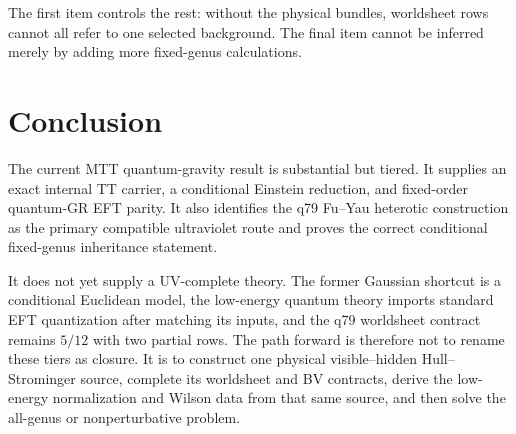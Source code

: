 \documentclass[11pt]{article}
\begin{document}
The first item controls the rest: without the physical bundles, worldsheet
rows cannot all refer to one selected background. The final item cannot be
inferred merely by adding more fixed-genus calculations.

\section{Conclusion}

The current MTT quantum-gravity result is substantial but tiered. It supplies
an exact internal TT carrier, a conditional Einstein reduction, and
fixed-order quantum-GR EFT parity. It also identifies the q79 Fu--Yau
heterotic construction as the primary compatible ultraviolet route and
proves the correct conditional fixed-genus inheritance statement.

It does not yet supply a UV-complete theory. The former Gaussian shortcut is
a conditional Euclidean model, the low-energy quantum theory imports
standard EFT quantization after matching its inputs, and the q79 worldsheet
contract remains \(5/12\) with two partial rows. The path forward is therefore
not to rename these tiers as closure. It is to construct one physical
visible--hidden Hull--Strominger source, complete its worldsheet and BV
contracts, derive the low-energy normalization and Wilson data from that same
source, and then solve the all-genus or nonperturbative problem.



\end{document}
